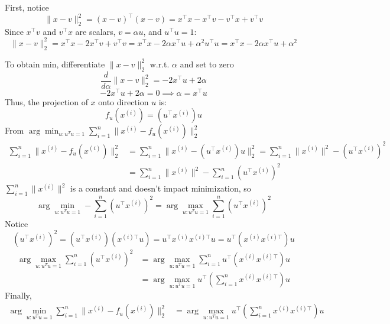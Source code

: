 \begin{answer}

First, notice
$$
\|x-v\|^{2}_{2} = (x-v)^{\top}(x-v)=x^{\top}x-x^{\top}v-v^{\top}x+v^{\top}v
$$
Since $x^{\top}v$ and $v^{\top}x$ are scalars, $v=\alpha u$, and $u^{\top}u=1$:
$$
\|x-v\|^{2}_{2} = x^{\top}x-2x^{\top}v+v^{\top}v=x^{\top}x-2\alpha x^{\top}u+\alpha^{2}u^{\top}u=x^{\top}x-2\alpha x^{\top}u+\alpha^{2}
$$

To obtain min, differentiate $\|x-v\|^{2}_{2}$ w.r.t. $\alpha$ and set to zero
$$
\frac{d}{d \alpha}\|x-v\|^{2}_{2}=-2x^{\top}u+2\alpha
$$
$$
-2x^{\top}u+2\alpha=0 \implies \alpha=x^{\top}u
$$
Thus, the projection of $x$ onto direction $u$ is:
$$
f_{u}(x^{(i)})=(u^{\top}x^{(i)})u
$$
From $\arg \min_{u:u^Tu=1} \sum_{i=1}^n \|x^{(i)}-f_u(x^{(i)})\|_2^2$
$$
\begin{align*}
\sum_{i=1}^n \|x^{(i)}-f_u(x^{(i)})\|_2^2
&= \sum_{i=1}^n \|x^{(i)}-(u^{\top}x^{(i)})u\|_2^2 = \sum_{i=1}^n \|x^{(i)}\|^{2}-(u^{\top}x^{(i)})^{2} \\
&= \sum_{i=1}^n \|x^{(i)}\|^{2} -\sum_{i=1}^n(u^{\top}x^{(i)})^{2}
\end{align*}
$$
$\sum_{i=1}^n \|x^{(i)}\|^{2}$ is a constant and doesn't impact minimization, so
$$
\arg \min_{u:u^Tu=1} -\sum_{i=1}^n(u^{\top}x^{(i)})^{2} = \arg \max_{u:u^Tu=1} \sum_{i=1}^n(u^{\top}x^{(i)})^{2}
$$
Notice
$$
(u^{\top}x^{(i)})^{2} 
= (u^{\top}x^{(i)})(x^{(i)\top}u)
= u^{\top}x^{(i)}x^{(i)\top}u
= u^{\top}(x^{(i)}x^{(i)\top})u
$$
$$
\begin{align*}
\arg \max_{u:u^Tu=1} \sum_{i=1}^n(u^{\top}x^{(i)})^{2} &= \arg \max_{u:u^Tu=1} \sum_{i=1}^n u^{\top}(x^{(i)}x^{(i)\top})u \\
&= \arg \max_{u:u^Tu=1} u^{\top}\left (\sum_{i=1}^nx^{(i)}x^{(i)\top} \right )u
\end{align*}
$$
Finally,
$$
\boxed{
\begin{align*}
\arg \min_{u:u^Tu=1} \sum_{i=1}^n \|x^{(i)}-f_u(x^{(i)})\|_2^2
&=  \arg \max_{u:u^Tu=1} u^{\top}\left (\sum_{i=1}^nx^{(i)}x^{(i)\top} \right )u
\end{align*}
}
$$

\end{answer}


  
